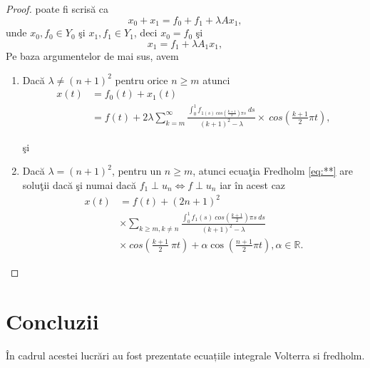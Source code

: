 \documentclass[a4paper,12pt,oneside]{report}
\begin{document}
\begin{proof}
\noindent poate fi scris\u{a} ca
\begin{displaymath}
  x_{0} + x_{1} = f_{0} + f_{1} + \lambda Ax_{1},
\end{displaymath}
unde \(x_{0} ,f_{0} \in Y_{0}\) \c{s}i \(x_{1} ,f_{1} \in Y_{1}\), deci \(x_{0} = f_{0}\)  \c{s}i
\begin{displaymath}
  x_{1} = f_{1} + \lambda A_{1}x_{1}, \label{eq:**} \tag{**}
\end{displaymath}
Pe baza argumentelor de mai sus, avem
\begin{enumerate}
    \item Dac\u{a} \(\lambda \neq \left ( n+1 \right )^{2}\) pentru orice \(n\geq m\) atunci
\begin{equation} \nonumber
    \begin{split}
       x\left ( t \right ) &   = f_{0}\left ( t \right ) + x_{1}\left ( t \right )  \\ &
        = f\left ( t \right ) + 2 \lambda \sum_{k=m}^{\infty }\frac{\int_{0}^{1}f_{1\left ( s \right ) \ cos\left ( \frac{k+1}{2} \right )\pi s }\ ds}{\left ( k+1 \right )^{2} - \lambda }\times \ cos \left ( \frac{k+1}{2}\pi t \right ),
    \end{split}
\end{equation}

 \c{s}i
 \item Dac\u{a} \(\lambda = \left ( n+1 \right )^{2}\), pentru un \(n\geq m\), atunci ecua\c{t}ia Fredholm \ref{eq:**} are solu\c{t}ii dac\u{a} \c{s}i numai dac\u{a} \(f_{1} \perp u_{n} \Leftrightarrow f \perp u_{n}\) iar \^{i}n acest caz
 \begin{equation} \nonumber
     \begin{split}
         x\left ( t \right ) &    = f\left ( t \right ) + \left ( 2n+1 \right )^{2} \\ &
         \times \sum_{k\geq m,k\neq n}\frac{\int_{0}^{1}f_{1}\left ( s \right ) \ cos \left ( \frac{k+1}{2} \right ) \pi s \ ds}{\left ( k+1 \right )^{2} - \lambda } \\ &
          \times  \ cos \left ( \frac{k+1}{2}\ \pi t  \right ) + \alpha  \cos \left ( \frac{n+1}{2} \pi t \right ), \alpha \in \mathbb{R}.
     \end{split}
 \end{equation}


\end{enumerate}

\end{proof}
\chapter {Concluzii}
În cadrul acestei lucrări au fost prezentate ecuațiile integrale Volterra si fredholm. 
\end{document}
